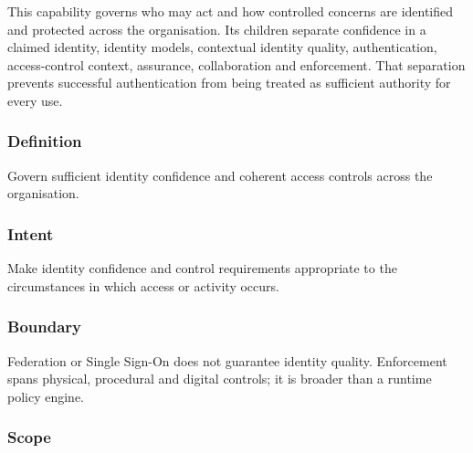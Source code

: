 This capability governs who may act and how controlled concerns are identified and protected across the organisation. Its children separate confidence in a claimed identity, identity models, contextual identity quality, authentication, access-control context, assurance, collaboration and enforcement. That separation prevents successful authentication from being treated as sufficient authority for every use.

\subsubsection*{Definition}

Govern sufficient identity confidence and coherent access controls across the organisation.

\subsubsection*{Intent}

Make identity confidence and control requirements appropriate to the circumstances in which access or activity occurs.

\subsubsection*{Boundary}

Federation or Single Sign-On does not guarantee identity quality. Enforcement spans physical, procedural and digital controls; it is broader than a runtime policy engine.

\subsubsection*{Scope}
